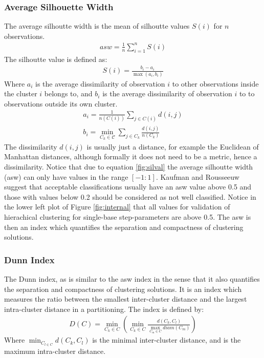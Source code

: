 \subsubsection{Average Silhouette Width}
The average silhoutte width is the mean of silhoutte values $S(i)$
for $n$ observations.
\begin{gather}
asw = \frac{1}{n} \sum_{i=1}^{n} S(i)
\end{gather}  
The silhoutte value is defined as:
\begin{gather}
\label{eq:silval}  
S(i) = \frac{b_{i}-a_{i}}{\max(a_{i},b_{i})}
\end{gather}
Where $a_{i}$ is the average dissimilarity of observation $i$ to other
observations inside the cluster $i$ belongs to, and
$b_{i}$ is the average dissimilarity of observation $i$ to to
observations outside its own cluster. 
\begin{gather}
a_{i} = \frac{1}{n(C(i))} \sum_{j \in C(i)} d(i,j)\\
b_{i} = \min_{C_{k} \in \mathcal{C}} \sum_{j \in C_{k}}\frac{d(i,j)}{n(C_{k})}
\end{gather}  
The dissimilarity $d(i,j)$ is usually just a distance, for example the
Euclidean of  Manhattan distances, although formally it  does not need
to be  a metric, hence a  dissimilarity.  Notice that  due to equation
\ref{fig:silval}  the  average silhoutte  width  (asw)  can only  have
values    in   the    range   $[-1:1]$.     Kaufman    and   Rousseeuw
\cite{kaufman1990}  suggest  that  acceptable classifications  usually
have an asw value above 0.5  and those with values below 0.2 should be
considered as not  well classified.  Notice in the  lower left plot of
Figure   \ref{fig:internal}  that   all  values   for   validation  of
hierachical clustering for single-base step-parameters are above 0.5.
The asw is then an index which quantifies the separation and compactness of
clustering solutions.

\subsubsection{Dunn Index}
The Dunn index, as is similar to the asw index in the sense that it
also quantifies the separation and compactness of clustering
solutions. It is an index which measures the ratio between the
smallest inter-cluster distance and the largest intra-cluster distance in a
partitioning.
The index is defined by:
\begin{gather}
D(C) = \min_{C_{k} \in C} ( \min_{C_{k} \in C} \frac{d(C_{k},C_{l})}{\max_{C_{m} \in C} diam(C_{m})} )
\end{gather}
Where $\min_{C_{l \in C}} d(C_{k},C_{l})$ is the minimal inter-cluster
distance, and is the maximum intra-cluster distance. 

